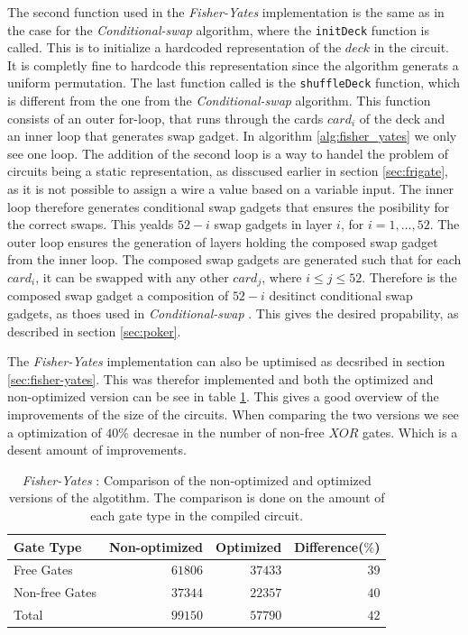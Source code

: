 \documentclass[twoside,11pt,openright]{report}
\newcommand{\FY}{\textit{Fisher-Yates} }
\newcommand{\CS}{\textit{Conditional-swap} }
\begin{document}
The second function used in the \FY implementation is the same as in the case for the \CS algorithm, where the \verb|initDeck| function is called. This is to initialize a hardcoded representation of the $deck$ in the circuit. It is completly fine to hardcode this representation since the algorithm generats a uniform permutation. The last function called is the \verb|shuffleDeck| function, which is different from the one from the \CS algorithm. This function consists of an outer for-loop, that runs through the cards $card_i$ of the deck and an inner loop that generates swap gadget. In algorithm \ref{alg:fisher_yates} we only see one loop. The addition of the second loop is a way to handel the problem of circuits being a static representation, as disscused earlier in section \ref{sec:frigate}, as it is not possible to assign a wire a value based on a variable input.  The inner loop therefore generates conditional swap gadgets that ensures the posibility for the correct swaps. This yealds $52-i$ swap gadgets in layer $i$, for $i=1,\dots, 52$. The outer loop ensures the generation of layers holding the composed swap gadget from the inner loop. The composed swap gadgets are generated such that for each $card_i$, it can be swapped with any other $card_j$, where $i\leq j\leq 52$. Therefore is the composed swap gadget a composition of $52-i$ desitinct conditional swap gadgets, as thoes used in \CS. This gives the desired propability, as described in section \ref{sec:poker}.

The \FY implementation can also be uptimised as decsribed in section \ref{sec:fisher-yates}. This was therefor implemented and both the optimized and non-optimized version can be see in table \ref{table:fy_swap_comp}. This gives a good overview of the improvements of the size of the circuits. When comparing the two versions we see a optimization of $40\%$ decresae in the number of non-free $XOR$ gates. Which is a desent amount of improvements.

\begin{table}[t]
\centering
\begin{tabular}{l || r r r}
Gate Type      & Non-optimized  & Optimized & Difference($\%$)    \\
\hline
Free Gates     & $61806$        & $37433$   & $39$ \\
Non-free Gates & $37344$        & $22357$   & $40$ \\
\hline
Total          & $99150$        & $57790$   & $42$
\end{tabular}
\caption{\FY: Comparison of the non-optimized and optimized versions of the algotithm. The comparison is done on the amount of each gate type in the compiled circuit.}
\label{table:fy_swap_comp}
\end{table}
\end{document}
